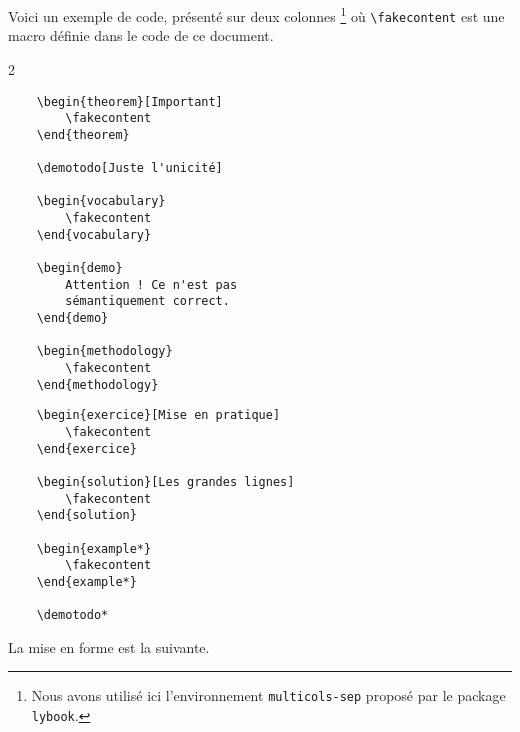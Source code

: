 Voici un exemple de code, présenté sur deux colonnes
\footnote{
	Nous avons utilisé ici l'environnement \texttt{multicols-sep} proposé par le package \texttt{lybook}.
}
où \verb+\fakecontent+ est une macro définie dans le code de ce document.

\begin{frame-gene}
	\small
	\begin{multicols-sep}{2}
		\begin{verbatim}
	\begin{theorem}[Important]
    	\fakecontent
	\end{theorem}

	\demotodo[Juste l'unicité]

	\begin{vocabulary}
    	\fakecontent
	\end{vocabulary}

	\begin{demo}
	    Attention ! Ce n'est pas
	    sémantiquement correct.
	\end{demo}

	\begin{methodology}
	    \fakecontent
	\end{methodology}
		\end{verbatim}


		\columnbreak


		\begin{verbatim}
	\begin{exercice}[Mise en pratique]
    	\fakecontent
	\end{exercice}

	\begin{solution}[Les grandes lignes]
    	\fakecontent
	\end{solution}

	\begin{example*}
	    \fakecontent
	\end{example*}

	\demotodo*
		\end{verbatim}
	\end{multicols-sep}
\end{frame-gene}




La mise en forme est la suivante.

